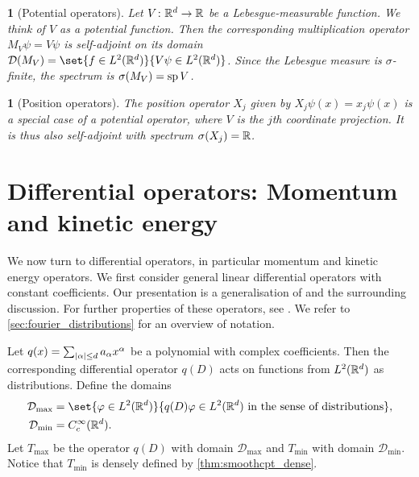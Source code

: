 \documentclass[article, a4paper, 11pt, oneside]{memoir}
\makeatletter
\let\phi\varphi
\numberwithin{equation}{chapter}
\newcommand{\dom}{\mathcal{D}}
\theoremstyle{myexample}
\theoremstyle{myexample}
\theoremstyle{myexamplebreak}
\theoremstyle{myexamplebreak}
\newtheorem{examplebreak}[theorem]{\protect\@example}
\theoremstyle{nonumberplain}
\theoremstyle{MyNonumberplain}
\newcommand{\@example}{}
\renewcommand{\@example}{Example}%
\renewcommand{\@example}{Eksempel}%
\makeatother
\begin{document}
\begin{examplebreak}[Potential operators]
    Let $V \colon \mathbb{R}^d \to \mathbb{R}$ be a Lebesgue-measurable function. We think of $V$ as a potential function. Then the corresponding multiplication operator $M_V \psi = V \psi$ is self-adjoint on its domain $\dom(M_V) = \set{ f \in L^2(\setR^d) }{ V \psi \in L^2(\setR^d) }$. Since the Lebesgue measure is $\sigma$-finite, the spectrum is $\sigma(M_V) = \operatorname{sp} V$.
\end{examplebreak}

\begin{examplebreak}[Position operators]
    \label{ex:position}
    The position operator $X_j$ given by $X_j \psi(x) = x_j \psi(x)$ is a special case of a potential operator, where $V$ is the $j$th coordinate projection. It is thus also self-adjoint with spectrum $\sigma(X_j) = \mathbb{R}$.
\end{examplebreak}


\section{Differential operators: Momentum and kinetic energy}
\label{sec:diff_operators}

We now turn to differential operators, in particular momentum and kinetic energy operators. We first consider general linear differential operators with constant coefficients. Our presentation is a generalisation of \textcite[Theorem~IX.27]{reedsimon2} and the surrounding discussion. For further properties of these operators, see \textcite[Section~8.2]{schmudgen2012}. We refer to \cref{sec:fourier_distributions} for an overview of notation.

Let $q(x) = \sum_{\lvert\alpha\rvert \leq d} a_\alpha x^\alpha$ be a polynomial with complex coefficients. Then the corresponding differential operator $q(D)$ acts on functions from $L^2(\mathbb{R}^d)$ as distributions. Define the domains
%
\begin{align*}
    \dom_{\max} &= \set{ \phi \in L^2(\setR^d) }{ q(D)\phi \in L^2(\setR^d) \text{ in the sense of distributions} }, \\
    \dom_{\min} &= \smoothcpt(\setR^d).
\end{align*}
%
Let $T_{\max}$ be the operator $q(D)$ with domain $\dom_{\max}$ and $T_{\min}$ with domain $\dom_{\min}$. Notice that $T_{\min}$ is densely defined by \cref{thm:smoothcpt_dense}.
\end{document}
